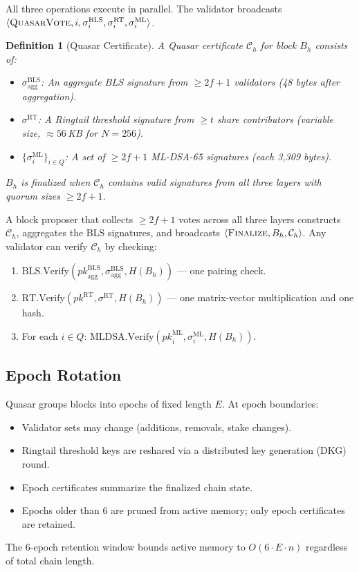\documentclass[11pt,a4paper]{article}
\newtheorem{definition}{Definition}[section]
\begin{document}
All three operations execute in parallel. The validator broadcasts
$\langle \textsc{QuasarVote}, i, \sigma_i^{\mathrm{BLS}},
\sigma_i^{\mathrm{RT}}, \sigma_i^{\mathrm{ML}} \rangle$.

\begin{definition}[Quasar Certificate]
A Quasar certificate $\mathcal{C}_h$ for block $B_h$ consists of:
\begin{itemize}[leftmargin=2em]
\item $\sigma^{\mathrm{BLS}}_{\mathrm{agg}}$: An aggregate BLS signature from
      $\geq 2f+1$ validators (48 bytes after aggregation).
\item $\sigma^{\mathrm{RT}}$: A Ringtail threshold signature from $\geq t$
      share contributors (variable size, $\approx 56$\,KB for $N=256$).
\item $\{\sigma_i^{\mathrm{ML}}\}_{i \in Q}$: A set of $\geq 2f+1$ ML-DSA-65
      signatures (each 3{,}309 bytes).
\end{itemize}
$B_h$ is finalized when $\mathcal{C}_h$ contains valid signatures from all
three layers with quorum sizes $\geq 2f+1$.
\end{definition}

A block proposer that collects $\geq 2f+1$ votes across all three layers
constructs $\mathcal{C}_h$, aggregates the BLS signatures, and broadcasts
$\langle \textsc{Finalize}, B_h, \mathcal{C}_h \rangle$. Any validator
can verify $\mathcal{C}_h$ by checking:
\begin{enumerate}[leftmargin=2em]
\item $\mathrm{BLS.Verify}(\mathit{pk}^{\mathrm{BLS}}_{\mathrm{agg}},
      \sigma^{\mathrm{BLS}}_{\mathrm{agg}}, H(B_h))$ --- one pairing check.
\item $\mathrm{RT.Verify}(\mathit{pk}^{\mathrm{RT}}, \sigma^{\mathrm{RT}},
      H(B_h))$ --- one matrix-vector multiplication and one hash.
\item For each $i \in Q$: $\mathrm{MLDSA.Verify}(\mathit{pk}_i^{\mathrm{ML}},
      \sigma_i^{\mathrm{ML}}, H(B_h))$.
\end{enumerate}

\subsection{Epoch Rotation}

Quasar groups blocks into epochs of fixed length $E$. At epoch boundaries:
\begin{itemize}[leftmargin=2em]
\item Validator sets may change (additions, removals, stake changes).
\item Ringtail threshold keys are reshared via a distributed key generation
      (DKG) round.
\item Epoch certificates summarize the finalized chain state.
\item Epochs older than 6 are pruned from active memory; only epoch
      certificates are retained.
\end{itemize}
The 6-epoch retention window bounds active memory to $O(6 \cdot E \cdot n)$
regardless of total chain length.
\end{document}
